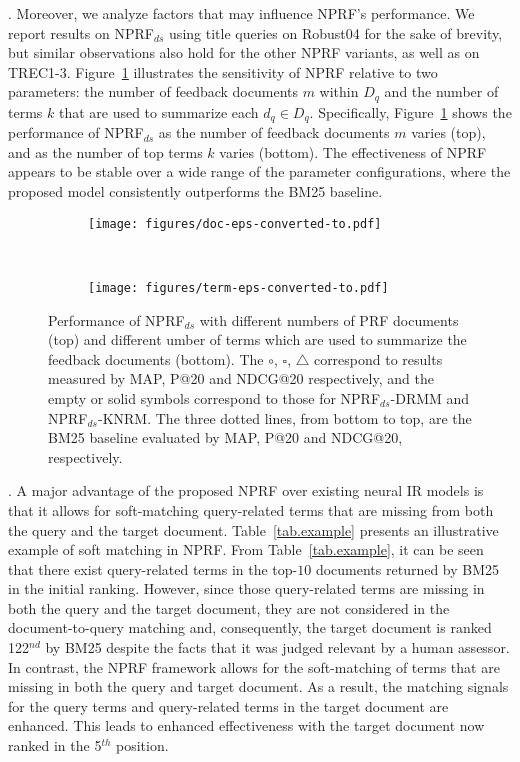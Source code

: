 \documentclass[11pt,a4paper]{article}
\begin{document}
. Moreover, we analyze factors that may influence NPRF's performance. We report results on NPRF$_{ds}$ using title queries on Robust04 for the sake of brevity, but similar observations also hold for the other NPRF variants, as well as on TREC1-3.
Figure~\ref{fig:param} illustrates the sensitivity of NPRF relative to two parameters: the number of feedback documents $m$ within $D_q$ and the number of terms $k$ that are used to summarize each $d_q \in D_q$. Specifically, Figure~\ref{fig:param} shows the performance of NPRF$_{ds}$ as the number of feedback documents
$m$ varies (top), and as the number of top terms $k$ varies (bottom). 
The effectiveness of NPRF appears to be stable over a wide range of the parameter configurations, where the proposed model consistently outperforms the BM25 baseline.


\begin{figure}[!htb]
	\centering
	\begin{subfigure}[]{0.5\textwidth}
		\centering
		\texttt{[image: figures/doc-eps-converted-to.pdf]}     
	\end{subfigure}\\ 
	\begin{subfigure}[]{0.5\textwidth}
		\centering
		\texttt{[image: figures/term-eps-converted-to.pdf]}
	\end{subfigure}
	\caption{\small Performance of NPRF$_{ds}$ with different numbers of PRF documents (top) and different umber of terms which are used to summarize the feedback documents (bottom). The $\circ$, $\square$, $\bigtriangleup$ correspond to results measured by MAP, P@20 and NDCG@20 respectively, and the empty or solid symbols correspond to those for NPRF$_{ds}$-DRMM and NPRF$_{ds}$-KNRM. The three dotted lines, from bottom to top, are the BM25 baseline evaluated by MAP, P@20 and NDCG@20, respectively.}\label{fig:param}
\end{figure}

. A major advantage of the proposed NPRF over existing neural IR models is that it allows for soft-matching query-related terms that are missing from both the query and the target document. Table~\ref{tab.example} presents an illustrative example of soft matching in NPRF. From Table~\ref{tab.example}, it can be seen that there exist query-related terms in the top-$10$ documents returned by BM25 in the initial ranking. However, since those query-related terms are missing in both the query and the target document, they are not considered in the document-to-query matching and, consequently, the target document is ranked 122$^{nd}$ by BM25 despite the facts that it was
judged relevant by a human assessor.
In contrast, the NPRF framework allows for the soft-matching of terms that are missing in both the query and target document.
As a result, the matching signals for the query terms and query-related terms in the target document are enhanced. This leads to enhanced effectiveness with the target document now ranked in the 5$^{th}$ position.
\end{document}
